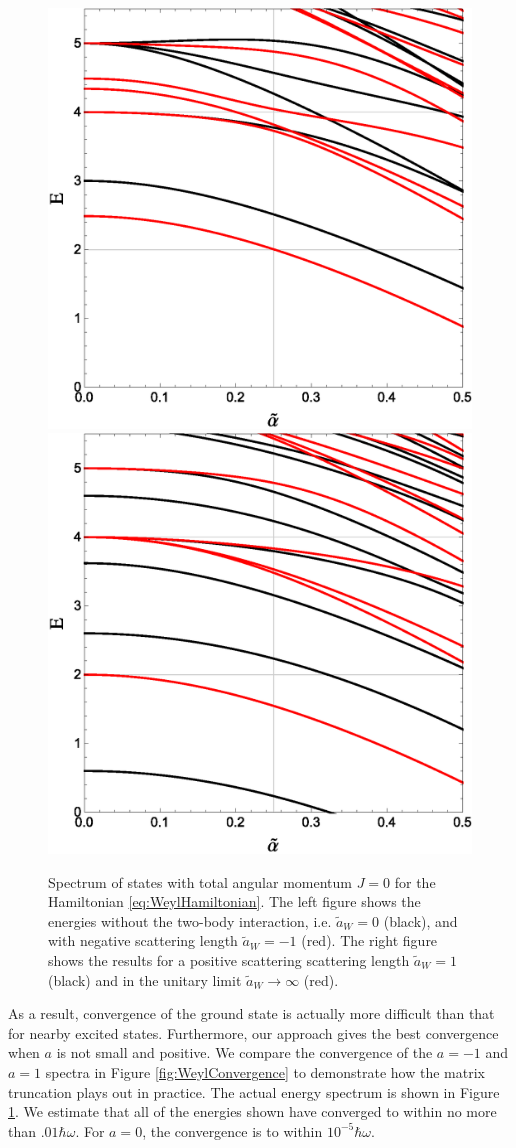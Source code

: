 \documentclass[%
 preprint,
 amsmath,amssymb,
 aps,
]{revtex4-1}
\begin{document}
\begin{figure}
\includegraphics[width=0.5\linewidth]{Figures/Weyla0am1}\nobreak
\includegraphics[width=0.5\linewidth]{Figures/Weyla1aInf}
\caption{\label{fig:WeylSpectrum} Spectrum of states with total angular momentum $J=0$ for the Hamiltonian \eqref{eq:WeylHamiltonian}. The left figure shows the energies without the two-body interaction, i.e. $\tilde{a}_W=0$ (black), and with negative scattering length $\tilde{a}_W=-1$ (red). The right figure shows the results for a positive scattering scattering length $\tilde{a}_W=1$ (black) and in the unitary limit $\tilde{a}_W\rightarrow\infty$ (red).} 
\end{figure}


As a result, convergence of the ground state is actually more difficult than that for nearby excited states. Furthermore, our approach gives the best convergence when $a$ is not small and positive. We compare the convergence of the $a=-1$ and $a=1$ spectra in Figure \ref{fig:WeylConvergence} to demonstrate how the matrix truncation plays out in practice. The actual energy spectrum is shown in Figure \ref{fig:WeylSpectrum}. We estimate that all of the energies shown have converged to within no more than $.01\hbar\omega$. For $a=0$, the convergence is to within $10^{-5}\hbar\omega$.
\end{document}
